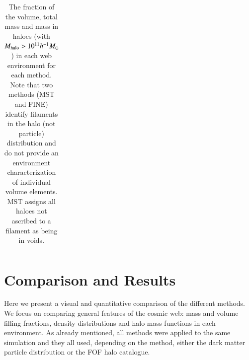 \begin{center}
\begin{table}
\begin{flushright}
\begin{tabular}{|c|cccc|cccc|cccc|}
 & &&&&&&&&&&&\\
\hline
\end{tabular}
\vskip 0.5cm
\caption{The fraction of the volume, total mass and mass in haloes (with $M_{\rm halo} > 10^{11}h^{-1}M_{\odot}$) in each web environment for each method. Note that two methods (MST and FINE) identify filaments in the halo (not particle) distribution and do not provide an environment characterization of individual volume elements. MST assigns all haloes not ascribed to a filament as being in voids.}
  \label{tab:mff}
\end{flushright}
\end{table}
\end{center}


\section{Comparison and Results}
\label{sec:results}

Here we present a visual and quantitative comparison of the different methods. We focus on comparing general features of the cosmic web: mass and volume filling fractions, density distributions and halo mass functions in each environment. As already mentioned, all methods were applied to the same simulation and they all used, depending on the method, either the dark matter particle distribution or the FOF halo catalogue.

